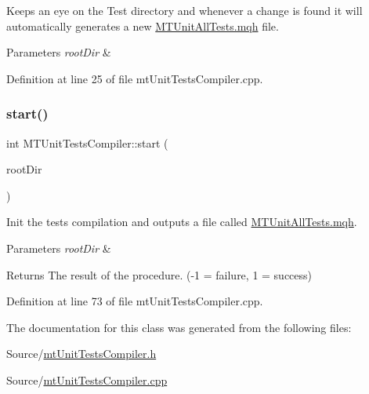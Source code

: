 Keeps an eye on the Test directory and whenever a change is found it will automatically generates a new \mbox{\hyperlink{_m_t_unit_all_tests_8mqh}{M\+T\+Unit\+All\+Tests.\+mqh}} file. 


\begin{DoxyParams}{Parameters}
{\em root\+Dir} & \\
\hline
\end{DoxyParams}


Definition at line 25 of file mt\+Unit\+Tests\+Compiler.\+cpp.

\mbox{\label{class_m_t_unit_tests_compiler_ac87a287b33abd2f15d2af2c589afdb73}} 
\subsubsection{\texorpdfstring{start()}{start()}}
{\footnotesize\ttfamily int M\+T\+Unit\+Tests\+Compiler\+::start (\begin{DoxyParamCaption}\item[{Q\+String}]{root\+Dir }\end{DoxyParamCaption})}



Init the tests compilation and outputs a file called \mbox{\hyperlink{_m_t_unit_all_tests_8mqh}{M\+T\+Unit\+All\+Tests.\+mqh}}. 


\begin{DoxyParams}{Parameters}
{\em root\+Dir} & \\
\hline
\end{DoxyParams}
\begin{DoxyReturn}{Returns}
The result of the procedure. (-\/1 = failure, 1 = success) 
\end{DoxyReturn}


Definition at line 73 of file mt\+Unit\+Tests\+Compiler.\+cpp.



The documentation for this class was generated from the following files\+:\begin{DoxyCompactItemize}
\item 
Source/\mbox{\hyperlink{mt_unit_tests_compiler_8h}{mt\+Unit\+Tests\+Compiler.\+h}}\item 
Source/\mbox{\hyperlink{mt_unit_tests_compiler_8cpp}{mt\+Unit\+Tests\+Compiler.\+cpp}}\end{DoxyCompactItemize}
